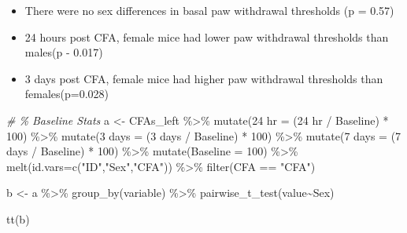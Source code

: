 \documentclass[
]{book}
\newenvironment{Shaded}{\begin{snugshade}}{\end{snugshade}}
\newcommand{\AttributeTok}[1]{\textcolor[rgb]{0.77,0.63,0.00}{#1}}
\newcommand{\CommentTok}[1]{\textcolor[rgb]{0.56,0.35,0.01}{\textit{#1}}}
\newcommand{\DecValTok}[1]{\textcolor[rgb]{0.00,0.00,0.81}{#1}}
\newcommand{\FunctionTok}[1]{\textcolor[rgb]{0.00,0.00,0.00}{#1}}
\newcommand{\NormalTok}[1]{#1}
\newcommand{\OtherTok}[1]{\textcolor[rgb]{0.56,0.35,0.01}{#1}}
\newcommand{\SpecialCharTok}[1]{\textcolor[rgb]{0.00,0.00,0.00}{#1}}
\newcommand{\StringTok}[1]{\textcolor[rgb]{0.31,0.60,0.02}{#1}}
\providecommand{\tightlist}{%
  \setlength{\itemsep}{0pt}\setlength{\parskip}{0pt}}
\begin{document}
\begin{itemize}
\tightlist
\item
  There were no sex differences in basal paw withdrawal thresholds (p = 0.57)
\item
  24 hours post CFA, female mice had lower paw withdrawal thresholds than males(p - 0.017)
\item
  3 days post CFA, female mice had higher paw withdrawal thresholds than females(p=0.028)
\end{itemize}

\begin{Shaded}
\begin{Highlighting}[]
\CommentTok{\# \% Baseline Stats}
\NormalTok{a }\OtherTok{\textless{}{-}}\NormalTok{ CFAs\_left }\SpecialCharTok{\%\textgreater{}\%}
  \FunctionTok{mutate}\NormalTok{(}\StringTok{\textasciigrave{}}\AttributeTok{24 hr}\StringTok{\textasciigrave{}} \OtherTok{=}\NormalTok{ (}\StringTok{\textasciigrave{}}\AttributeTok{24 hr}\StringTok{\textasciigrave{}} \SpecialCharTok{/} \StringTok{\textasciigrave{}}\AttributeTok{Baseline}\StringTok{\textasciigrave{}}\NormalTok{) }\SpecialCharTok{*} \DecValTok{100}\NormalTok{) }\SpecialCharTok{\%\textgreater{}\%}
  \FunctionTok{mutate}\NormalTok{(}\StringTok{\textasciigrave{}}\AttributeTok{3 days}\StringTok{\textasciigrave{}} \OtherTok{=}\NormalTok{ (}\StringTok{\textasciigrave{}}\AttributeTok{3 days}\StringTok{\textasciigrave{}} \SpecialCharTok{/} \StringTok{\textasciigrave{}}\AttributeTok{Baseline}\StringTok{\textasciigrave{}}\NormalTok{) }\SpecialCharTok{*} \DecValTok{100}\NormalTok{) }\SpecialCharTok{\%\textgreater{}\%}
  \FunctionTok{mutate}\NormalTok{(}\StringTok{\textasciigrave{}}\AttributeTok{7 days}\StringTok{\textasciigrave{}} \OtherTok{=}\NormalTok{ (}\StringTok{\textasciigrave{}}\AttributeTok{7 days}\StringTok{\textasciigrave{}} \SpecialCharTok{/} \StringTok{\textasciigrave{}}\AttributeTok{Baseline}\StringTok{\textasciigrave{}}\NormalTok{) }\SpecialCharTok{*} \DecValTok{100}\NormalTok{) }\SpecialCharTok{\%\textgreater{}\%}
  \FunctionTok{mutate}\NormalTok{(}\AttributeTok{Baseline =} \DecValTok{100}\NormalTok{) }\SpecialCharTok{\%\textgreater{}\%}
  \FunctionTok{melt}\NormalTok{(}\AttributeTok{id.vars=}\FunctionTok{c}\NormalTok{(}\StringTok{"ID"}\NormalTok{,}\StringTok{"Sex"}\NormalTok{,}\StringTok{"CFA"}\NormalTok{)) }\SpecialCharTok{\%\textgreater{}\%}
  \FunctionTok{filter}\NormalTok{(CFA }\SpecialCharTok{==} \StringTok{"CFA"}\NormalTok{)}

\NormalTok{b }\OtherTok{\textless{}{-}}\NormalTok{ a }\SpecialCharTok{\%\textgreater{}\%} 
  \FunctionTok{group\_by}\NormalTok{(variable) }\SpecialCharTok{\%\textgreater{}\%}
  \FunctionTok{pairwise\_t\_test}\NormalTok{(value}\SpecialCharTok{\textasciitilde{}}\NormalTok{Sex)}

\FunctionTok{tt}\NormalTok{(b)}
\end{Highlighting}
\end{Shaded}
\end{document}
